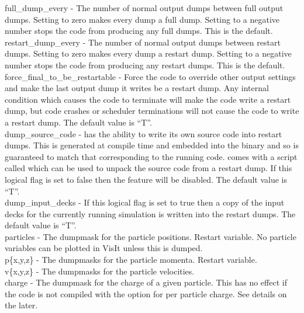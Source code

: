 {\emphtext full\_dump\_every} - The number of normal output dumps between full
output dumps. Setting to zero makes every dump a full dump. Setting to a
negative number stops the code from producing any full dumps. This is the
default.\\

{\emphtext restart\_dump\_every} - The number of normal output dumps between
restart dumps. Setting to zero makes every dump a restart dump. Setting to a
negative number stops the code from producing any restart dumps. This is the
default.\\

{\emphtext force\_final\_to\_be\_restartable} - Force the code to override
other output settings and make the last output dump it writes be a restart
dump. Any internal condition which causes the code to terminate will make the
code write a restart dump, but code crashes or scheduler terminations will not
cause the code to write a restart dump. The default value is ``T''.\\

{\emphtext dump\_source\_code} - {\EPOCH} has the ability to write its own
source code into restart dumps. This is generated at compile time and embedded
into the binary and so is guaranteed to match that corresponding to the running
code. {\EPOCH} comes with a script called
 which can be used to unpack the
source code from a restart dump. If this logical flag is set to false then 
the feature will be disabled. The default value is ``T''.\\

{\emphtext dump\_input\_decks} - If this logical flag is set to true then
a copy of the input decks for the currently running simulation is written
into the restart dumps. The default value is ``T''.\\

{\emphtext particles} - The dumpmask for the particle positions. Restart
variable. No particle variables can be plotted in VisIt unless this is
dumped.\\

{\emphtext p\{x,y,z\}} - The dumpmasks for the particle momenta. Restart
variable.\\

{\emphtext v\{x,y,z\}} - The dumpmasks for the particle velocities.\\

{\emphtext charge} - The dumpmask for the charge of a given particle. This
has no effect if the code is not compiled with the option for per particle
charge. See details on the  later.\\

